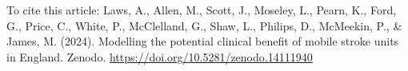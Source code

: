 \documentclass{article}
\begin{document}

\maketitle
\begin{refsection} %

To cite this article: Laws, A., Allen, M., Scott, J., Moseley, L., Pearn, K., Ford, G., Price, C., White, P., McClelland, G., Shaw, L., Philips, D., McMeekin, P., \& James, M. (2024). Modelling the potential clinical benefit of mobile stroke units in England. Zenodo. \url{https://doi.org/10.5281/zenodo.14111940}





\clearpage
\newpage
\printbibliography
\end{refsection}
%

\newcommand{\beginsupplement}{
    \setcounter{section}{0}
    \renewcommand{\thesection}{S\arabic{section}}
    \setcounter{figure}{0}
    \renewcommand{\thefigure}{S\arabic{figure}}
    \setcounter{table}{0}
    \renewcommand{\thetable}{S\arabic{table}}

}
\begin{refsection} %
\beginsupplement

%
\printbibliography
\end{refsection}
\end{document}
